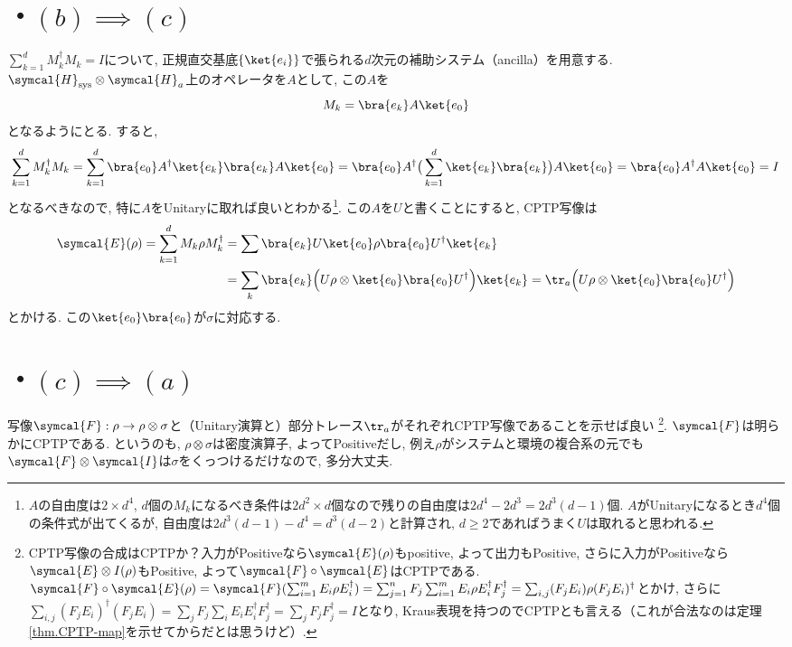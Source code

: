 \section*{・$(b)\implies (c)$}
  $\sum_{k=1}^d M_k^\dag M_k=I$について, 正規直交基底$\{\ket{e_i}\}$で張られる$d$次元の補助システム（ancilla）を用意する. 
  $\symcal{H}_{\text{sys}}\otimes \symcal{H}_a$上のオペレータを$A$として, この$A$を
  \begin{equation}
    M_k=\bra{e_k}A\ket{e_0}
  \end{equation}
  となるようにとる. 
  すると, 
  \begin{equation}
    \sum_{k=1}^d M_k^\dag M_k=\sum_{k=1}^{d}\bra{e_0}A^\dag\ket{e_k}\bra{e_k}A\ket{e_0}=\bra{e_0}A^\dag\big(\sum_{k=1}^d\ket{e_k}\bra{e_k}\big)A\ket{e_0}=\bra{e_0}A^\dag A\ket{e_0}=I
  \end{equation}
  となるべきなので, 特に$A$をUnitaryに取れば良いとわかる\footnote{$A$の自由度は$2\times d^4$, $d$個の$M_k$になるべき条件は$2d^2\times d$個なので残りの自由度は$2d^4-2d^3=2d^3(d-1)$個. $A$がUnitaryになるとき$d^4$個の条件式が出てくるが, 自由度は$2d^3(d-1)-d^4=d^3(d-2)$と計算され, $d\geq 2$であればうまく$U$は取れると思われる. }. 
  この$A$を$U$と書くことにすると, CPTP写像は
  \begin{align}
    \symcal{E}(\rho)=\sum_{k=1}^d M_k\rho M_k^\dag&=\sum \bra{e_k}U\ket{e_0}\rho\bra{e_0}U^\dag \ket{e_k}\\
    &=\sum_{k}\bra{e_k}\Big(U\rho\otimes \ket{e_0}\bra{e_0}U^\dag\Big)\ket{e_k}
    =\tr_{a}\Big(U\rho\otimes \ket{e_0}\bra{e_0}U^\dag\Big)
  \end{align}
  とかける. 
  この$\ket{e_0}\bra{e_0}$が$\sigma$に対応する. 

\section*{・$(c)\implies (a)$}
  写像$\symcal{F}:\rho\to\rho\otimes\sigma$と（Unitary演算と）部分トレース$\tr_a$がそれぞれCPTP写像であることを示せば良い
  \footnote{CPTP写像の合成はCPTPか？入力がPositiveなら$\symcal{E}(\rho)$もpositive, よって出力もPositive, さらに入力がPositiveなら$\symcal{E}\otimes I(\rho)$もPositive, よって$\symcal{F}\circ\symcal{E}$はCPTPである. 
  $\symcal{F}\circ\symcal{E}(\rho)=\symcal{F}(\sum_{i=1}^mE_i\rho E_i^\dag)=\sum_{j=1}^n F_j\sum_{i=1}^m E_i\rho E_i^\dag F_j^\dag=\sum_{i,j}(F_jE_i)\rho(F_jE_i)^\dag$とかけ, さらに$\sum_{i,j}(F_jE_i)^\dag (F_jE_i)=\sum_{j}F_j\sum_{i}E_iE_i^\dag F_j^\dag=\sum_j F_j F_j^\dag=I$となり, Kraus表現を持つのでCPTPとも言える（これが合法なのは定理\ref{thm.CPTP-map}を示せてからだとは思うけど）. }. 
  $\symcal{F}$は明らかにCPTPである. 
  というのも, $\rho\otimes\sigma$は密度演算子, よってPositiveだし, 例え$\rho$がシステムと環境の複合系の元でも$\symcal{F}\otimes \symcal{I}$は$\sigma$をくっつけるだけなので, 多分大丈夫. 

